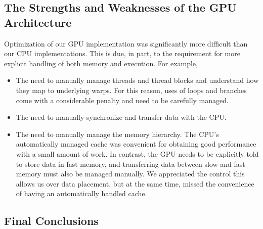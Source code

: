 \documentclass[11pt]{article} %
\begin{document}
\subsection{The Strengths and Weaknesses of the GPU Architecture}
Optimization of our GPU implementation was significantly more difficult
than our CPU implementations. This is due, in part, to the requirement
for more explicit handling of both memory and execution. For example,
\begin{itemize}
\item The need to manually manage threads and thread blocks and understand
how they map to underlying warps. For this reason, uses of loops and
branches come with a considerable penalty and need to be carefully
managed.
\item The need to manually synchronize and transfer data with the CPU.
\item The need to manually manage the memory hierarchy. The CPU's automatically
managed cache was convenient for obtaining good performance with a
small amount of work. In contrast, the GPU needs to be explicitly
told to store data in fast memory, and transferring data between slow
and fast memory must also be managed manually. We appreciated the
control this allows us over data placement, but at the same time,
missed the convenience of having an automatically handled cache.\end{itemize}

\subsection{Final Conclusions}
\end{document}
